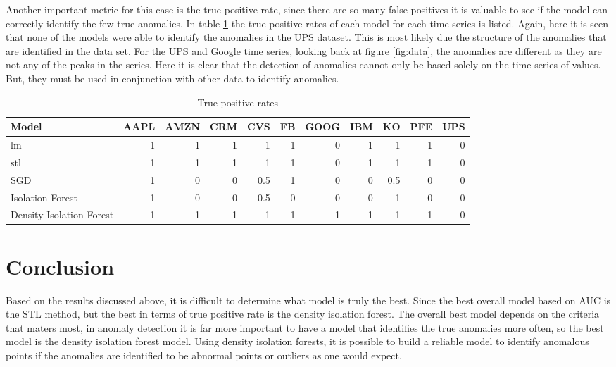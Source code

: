 \documentclass{article}
\begin{document}
Another important metric for this case is the true positive rate, since there are so many false positives it is valuable to see if the model can correctly identify the few true anomalies. In table \ref{tab:tp_rates} the true positive rates of each model for each time series is listed. Again, here it is seen that none of the models were able to identify the anomalies in the UPS dataset. This is most likely due the structure of the anomalies that are identified in the data set. For the UPS and Google time series, looking back at figure \ref{fig:data}, the anomalies are different as they are not any of the peaks in the series. Here it is clear that the detection of anomalies cannot only be based solely on the time series of values. But, they must be used in conjunction with other data to identify anomalies. 

\begin{table}[ht]
    \caption{True positive rates}
    \label{tab:tp_rates}
    \centering
    \small
    \begin{tabular}{l|r|r|r|r|r|r|r|r|r|r}
        \hline
        Model & AAPL & AMZN & CRM & CVS & FB & GOOG & IBM & KO & PFE & UPS\\
        \hline
        lm & 1 & 1 & 1 & 1 & 1 & 0 & 1 & 1 & 1 & 0\\
        \hline
        stl & 1 & 1 & 1 & 1 & 1 & 0 & 1 & 1 & 1 & 0\\
        \hline
        SGD & 1 & 0 & 0 & 0.5 & 1 & 0 & 0 & 0.5 & 0 & 0\\
        \hline
        Isolation Forest & 1 & 0 & 0 & 0.5 & 0 & 0 & 0 & 1 & 0 & 0\\
        \hline
        Density Isolation Forest & 1 & 1 & 1 & 1 & 1 & 1 & 1 & 1 & 1 & 0\\
        \hline
    \end{tabular}
\end{table}

\section{Conclusion}
Based on the results discussed above, it is difficult to determine what model is truly the best. Since the best overall model based on AUC is the STL method, but the best in terms of true positive rate is the density isolation forest. The overall best model depends on the criteria that maters most, in anomaly detection it is far more important to have a model that identifies the true anomalies more often, so the best model is the density isolation forest model. Using density isolation forests, it is possible to build a reliable model to identify anomalous points if the anomalies are identified to be abnormal points or outliers as one would expect. 
\end{document}
